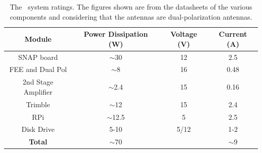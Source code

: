 \begin{table}
	\centering
	\begin{tabular}{|c | c | c | c |} 
		\hline
		Module & Power Dissipation (W) &  Voltage (V) & Current (A)\\  
		\hline
		SNAP board & $\sim$30 & 12 & 2.5\\
		\hline
		FEE and Dual Pol & $\sim$8 & 16 & 0.48 \\
		\hline
		2nd Stage Amplifier & $\sim$2.4 & 15 & 0.16\\
		\hline
		Trimble & $\sim$12 & 15 & 2.4\\
		\hline
		RPi & $\sim$12.5 & 5 & 2.5 \\
		\hline
		Disk Drive & 5-10 & 5/12 & 1-2 \\
		\hline
		\textbf{Total} & $\sim$70 &  & $\sim$9 \\
		\hline
	\end{tabular}
	\caption{The \albatros\ system ratings. The figures shown are from the datasheets of the various components and considering that the antennas are dual-polarization antennas.}
	\label{Table:budget2}
\end{table}

